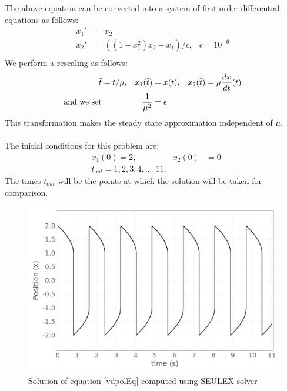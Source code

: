 \documentclass[notitlepage,12pt]{article}
\begin{document}
The above equation can be converted into a system of first-order differential equations as follows:
\begin{equation}
\begin{aligned}
	x_1' &= x_2\\
	x_2' &= \left(\left(1-x_1^2\right)x_2-x_1\right)/\epsilon, &\epsilon = 10^{-6}\\
\end{aligned}
\end{equation}
We perform a rescaling as follows:
\begin{equation}
\begin{aligned}
\tilde{t} &= t/\mu, &x_1(\tilde{t})&=x(t), &x_2(\tilde{t})=\mu \frac{dx}{dt}(t)\\
\textnormal{and we set}& &\frac{1}{\mu^2} &= \epsilon
\end{aligned}
\end{equation}
This transformation makes the steady state approximation independent of $\mu$.\\ \\
The initial conditions for this problem are:
\begin{equation}
\begin{aligned}
&x_1(0) =2, &x_2(0)&= 0\\
&t_{out} =1,2,3,4,\ldots,11.
\end{aligned}
\end{equation}
The times $t_{out}$ will be the points at which the solution will be taken for comparison.

\begin{figure}[H]
\centering
\includegraphics[scale=0.30]{../ImagesAndPDFs/Plots/vdpolPlot.png}
\caption{Solution of equation \eqref{vdpolEq} computed using SEULEX solver}
\label{vdpolPlot}
\end{figure}
\end{document}
